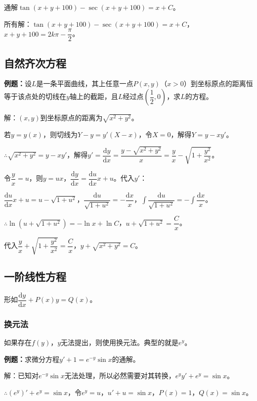 \documentclass[UTF8, 12pt]{ctexart}
\begin{document}
通解$\tan(x+y+100)-\sec(x+y+100)=x+C$。

所有解：$\tan(x+y+100)-\sec(x+y+100)=x+C$，$x+y+100=2k\pi-\dfrac{\pi}{2}$。

\subsection{自然齐次方程}

\textbf{例题：}设$L$是一条平面曲线，其上任意一点$P(x,y)$（$x>0$）到坐标原点的距离恒等于该点处的切线在$y$轴上的截距，且$L$经过点$\left(\dfrac{1}{2},0\right)$，求$L$的方程。

解：$(x,y)$到坐标原点的距离为$\sqrt{x^2+y^2}$。

若$y=y(x)$，则切线为$Y-y=y'(X-x)$，令$X=0$，解得$Y=y-xy'$。

$\therefore\sqrt{x^2+y^2}=y-xy'$，解得$y'=\dfrac{\textrm{d}y}{\textrm{d}x}=\dfrac{y-\sqrt{x^2+y^2}}{x}=\dfrac{y}{x}-\sqrt{1+\dfrac{y^2}{x^2}}$。

令$\dfrac{y}{x}=u$，则$y=ux$，$\dfrac{\textrm{d}y}{\textrm{d}x}=\dfrac{\textrm{d}u}{\textrm{d}x}x+u$。代入$y'$：

$\dfrac{\textrm{d}u}{\textrm{d}x}x+u=u-\sqrt{1+u^2}$，$\dfrac{\textrm{d}u}{\sqrt{1+u^2}}=-\dfrac{\textrm{d}x}{x}$，$\displaystyle{\int\dfrac{\textrm{d}u}{\sqrt{1+u^2}}=-\int\dfrac{\textrm{d}x}{x}}$。

$\therefore\ln(u+\sqrt{1+u^2})=-\ln x+\ln C$，$u+\sqrt{1+u^2}=\dfrac{C}{x}$。

代入$\dfrac{y}{x}+\sqrt{1+\dfrac{y^2}{x^2}}=\dfrac{C}{x}$，$y+\sqrt{x^2+y^2}=C$。

\subsection{一阶线性方程}

形如$\dfrac{\textrm{d}y}{\textrm{d}x}+P(x)y=Q(x)$。

\subsubsection{换元法}

如果存在$f(y)$，$y$无法提出，则使用换元法。典型的就是$e^y$。

\textbf{例题：}求微分方程$y'+1=e^{-y}\sin x$的通解。

解：已知对$e^{-y}\sin x$无法处理，所以必然需要对其转换，$e^yy'+e^y=\sin x$。

$\therefore(e^y)'+e^y=\sin x$，令$e^y=u$，$u'+u=\sin x$，$P(x)=1$，$Q(x)=\sin x$。
\end{document}
